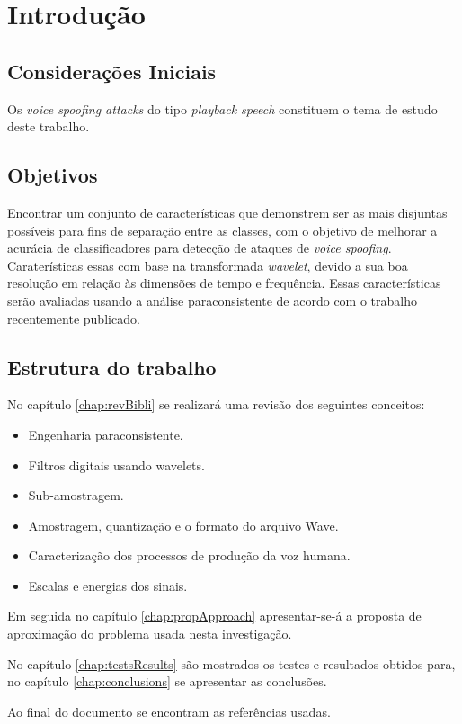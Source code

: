 \chapter{Introdução}
	\section{Considerações Iniciais}
		\par Os \textit{voice spoofing attacks} do tipo \textit{playback speech} constituem o tema de estudo deste trabalho.
						 
	\section{Objetivos}
		\par Encontrar um conjunto de características que demonstrem ser as mais disjuntas possíveis para fins de separação entre as classes, com o objetivo de melhorar a acurácia de classificadores para detecção de ataques de \textit{voice spoofing}. Caraterísticas essas com base na transformada \textit{wavelet}, devido a sua boa resolução em relação às dimensões de tempo e frequência. Essas características serão avaliadas usando a análise paraconsistente de acordo com o trabalho \cite{8588433} recentemente publicado.
			
	\section{Estrutura do trabalho}
		\par No capítulo \ref{chap:revBibli} se realizará uma revisão dos seguintes conceitos:
		\begin{itemize}
			\item Engenharia paraconsistente.
			\item Filtros digitais usando wavelets.
			\item Sub-amostragem.
			\item Amostragem, quantização e o formato do arquivo Wave.
			\item Caracterização dos processos de produção da voz humana.
			\item Escalas e energias dos sinais.
		\end{itemize}
		\par Em seguida no capítulo \ref{chap:propApproach} apresentar-se-á a proposta de aproximação do problema usada nesta investigação. 
		\par No capítulo \ref{chap:testsResults} são mostrados os testes e resultados obtidos para, no capítulo \ref{chap:conclusions} se apresentar as conclusões.
		\par Ao final do documento se encontram as referências usadas.